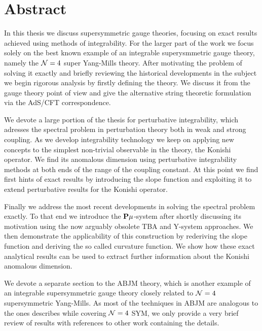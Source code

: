 
\section*{Abstract}

\vspace{30pt}

In this thesis we discuss supersymmetric gauge theories, focusing on exact results achieved using methods of integrability. 
For the larger part of the work we focus solely on the best known example of an integrable superysmmetric gauge theory, namely the $\mathcal{N}=4$ super Yang-Mills theory.
After motivating the problem of solving it exactly and briefly reviewing the historical developments in the subject we begin rigorous analysis by firstly defining the theory. 
We discuss it from the gauge theory point of view and give the alternative string theoretic formulation via the AdS/CFT correspondence.

We devote a large portion of the thesis for perturbative integrability, which adresses the spectral problem in perturbation theory both in weak and strong coupling. 
As we develop integrability technology we keep on applying new concepts to the simplest non-trivial observable in the theory, the Konishi operator.
We find its anomalous dimension using perturbative integrability methods at both ends of the range of the coupling constant.
At this point we find first hints of exact results by introducing the slope function and exploiting it to extend perturbative results for the Konishi operator.

Finally we address the most recent developments in solving the spectral problem exactly.
To that end we introduce the ${\bf P}\mu$-system after shortly discussing its motivation using the now arguably obsolete TBA and Y-system approaches. 
We then demonstrate the applicability of this construction by rederiving the slope function and deriving the so called curvature function.
We show how these exact analytical results can be used to extract further information about the Konishi anomalous dimension. 

We devote a separate section to the ABJM theory, which is another example of an integrable supersymmetric gauge theory closely related to $\mathcal{N}=4$ supersymmetric Yang-Mills. 
As most of the techniques in ABJM are analogous to the ones describes while covering $\mathcal{N}=4$ SYM, we only provide a very brief review of results with references to other work containing the details.
